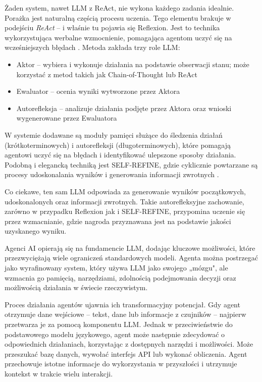 Żaden system, nawet LLM z ReAct, nie wykona każdego zadania idealnie. Porażka jest naturalną częścią procesu uczenia. Tego elementu brakuje w podejściu \textit{ReAct} – i właśnie tu pojawia się Reflexion. Jest to technika wykorzystująca werbalne wzmocnienie, pomagająca agentom uczyć się na wcześniejszych błędach \cite{reflexion}. Metoda zakłada trzy role LLM:
\begin{itemize}
\item Aktor – wybiera i wykonuje działania na podstawie obserwacji stanu; może korzystać z metod takich jak Chain-of-Thought lub ReAct
\item Ewaluator – ocenia wyniki wytworzone przez Aktora
\item Autorefleksja – analizuje działania podjęte przez Aktora oraz wnioski wygenerowane przez Ewaluatora
\end{itemize}

W systemie dodawane są moduły pamięci służące do śledzenia działań (krótkoterminowych) i autorefleksji (długoterminowych), które pomagają agentowi uczyć się na błędach i identyfikować ulepszone sposoby działania. Podobną i elegancką techniką jest SELF-REFINE, gdzie cyklicznie powtarzane są procesy udoskonalania wyników i generowania informacji zwrotnych \cite{self-refine}.

Co ciekawe, ten sam LLM odpowiada za generowanie wyników początkowych, udoskonalonych oraz informacji zwrotnych. Takie autorefleksyjne zachowanie, zarówno w przypadku Reflexion jak i SELF-REFINE, przypomina uczenie się przez wzmacnianie, gdzie nagroda przyznawana jest na podstawie jakości uzyskanego wyniku.

Agenci AI opierają się na fundamencie LLM, dodając kluczowe możliwości, które przezwyciężają wiele ograniczeń standardowych modeli. Agenta można postrzegać jako wyrafinowany system, który używa LLM jako swojego „mózgu", ale wzmacnia go pamięcią, narzędziami, zdolnością podejmowania decyzji oraz możliwością działania w świecie rzeczywistym.

Proces działania agentów ujawnia ich transformacyjny potencjał. Gdy agent otrzymuje dane wejściowe – tekst, dane lub informacje z czujników – najpierw przetwarza je za pomocą komponentu LLM. Jednak w przeciwieństwie do podstawowego modelu językowego, agent może następnie zdecydować o odpowiednich działaniach, korzystając z dostępnych narzędzi i możliwości. Może przeszukać bazę danych, wywołać interfejs API lub wykonać obliczenia. Agent przechowuje istotne informacje do wykorzystania w przyszłości i utrzymuje kontekst w trakcie wielu interakcji.


